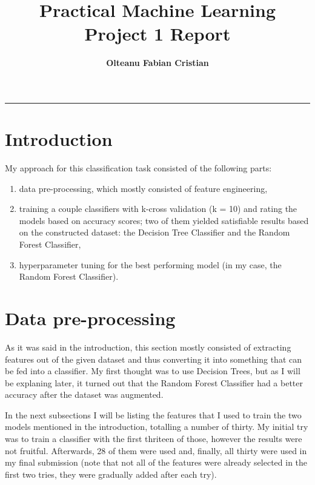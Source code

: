 \documentclass{article}
\author{\textbf{Olteanu Fabian Cristian}}
\affil{FMI, AI Master, Year 1
}
\title{\textbf{\huge Practical Machine Learning Project 1 Report}}
\date{}
\begin{document}
\pagestyle{headings}	
\newpage
\setcounter{page}{1}
\renewcommand{\thepage}{\arabic{page}}


	
	
\setlength{\parskip}{0.5em}
	
\maketitle
	
\noindent\rule{15cm}{0.4pt}

\section{Introduction}
My approach for this classification task consisted of the following parts: 
\begin{enumerate}
	\item data pre-processing, which mostly consisted of feature engineering,
	\item training a couple classifiers with k-cross validation (k = 10) and rating the models based on accuracy scores; two of them yielded satisfiable results based on the constructed dataset: the Decision Tree Classifier and the Random Forest Classifier,
	\item hyperparameter tuning for the best performing model (in my case, the Random Forest Classifier).
\end{enumerate}

\section{Data pre-processing}
As it was said in the introduction, this section mostly consisted of extracting features out of the given dataset and thus converting it into something that can be fed into a classifier. My first thought was to use Decision Trees, but as I will be explaning later, it turned out that the Random Forest Classifier had a better accuracy after the dataset was augmented.

In the next subsections I will be listing the features that I used to train the two models mentioned in the introduction, totalling a number of thirty. My initial try was to train a classifier with the first thriteen of those, however the results were not fruitful. Afterwards, 28 of them were used and, finally, all thirty were used in my final submission (note that not all of the features were already selected in the first two tries, they were gradually added after each try).   
\end{document}
